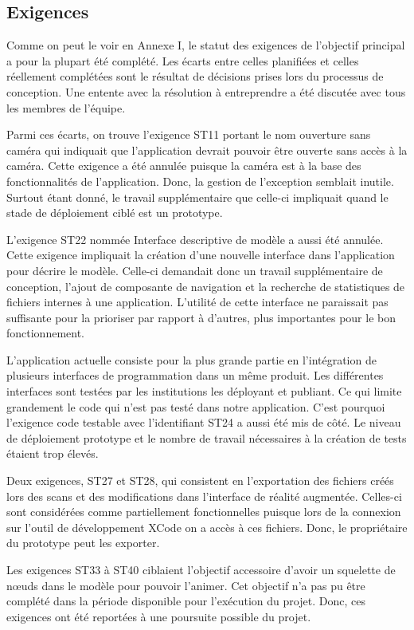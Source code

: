\documentclass[rapport.tex]{subfiles}
\begin{document}
\subsection*{Exigences}
Comme on peut le voir en Annexe I, le statut des exigences de l’objectif principal a pour la plupart été complété. Les écarts entre celles planifiées et celles réellement complétées sont le résultat de décisions prises lors du processus de conception. Une entente avec la résolution à entreprendre a été discutée avec tous les membres de l’équipe.
\par
Parmi ces écarts, on trouve l’exigence ST11 portant le nom ouverture sans caméra qui indiquait que l’application devrait pouvoir être ouverte sans accès à la caméra. Cette exigence a été annulée puisque la caméra est à la base des fonctionnalités de l’application. Donc, la gestion de l’exception semblait inutile. Surtout étant donné, le travail supplémentaire que celle-ci impliquait quand le stade de déploiement ciblé est un prototype.
\par
L’exigence ST22 nommée Interface descriptive de modèle a aussi été annulée. Cette exigence impliquait la création d’une nouvelle interface dans l’application pour décrire le modèle. Celle-ci demandait donc un travail supplémentaire de conception, l’ajout de composante de navigation et la recherche de statistiques de fichiers internes à une application. L’utilité de cette interface ne paraissait pas suffisante pour la prioriser par rapport à d’autres, plus importantes pour le bon fonctionnement.
\par
L’application actuelle consiste pour la plus grande partie en l’intégration de plusieurs interfaces de programmation dans un même produit. Les différentes interfaces sont testées par les institutions les déployant et publiant. Ce qui limite grandement le code qui n’est pas testé dans notre application. C’est pourquoi l’exigence code testable avec l’identifiant ST24 a aussi été mis de côté. Le niveau de déploiement prototype et le nombre de travail nécessaires à la création de tests étaient trop élevés.
\par
Deux exigences, ST27 et ST28, qui consistent en l’exportation des fichiers créés lors des scans et des modifications dans l’interface de réalité augmentée. Celles-ci sont considérées comme partiellement fonctionnelles puisque lors de la connexion sur l’outil de développement XCode on a accès à ces fichiers. Donc, le propriétaire du prototype peut les exporter.
\par
Les exigences ST33 à ST40 ciblaient l’objectif accessoire d’avoir un squelette de nœuds dans le modèle pour pouvoir l’animer. Cet objectif n’a pas pu être complété dans la période disponible pour l’exécution du projet. Donc, ces exigences ont été reportées à une poursuite possible du projet.
\end{document}
